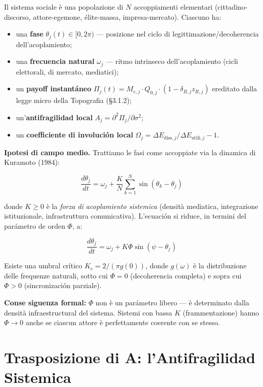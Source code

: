 Il sistema sociale è una popolazione di \(N\) accoppiamenti elementari
(cittadino-discorso, attore-egemone, élite-massa, impresa-mercato).
Ciascuno ha:

\begin{itemize}
\tightlist
\item
  una \textbf{fase} \(\theta_j(t) \in [0, 2\pi)\) --- posizione nel
  ciclo di legittimazione/decoherencia dell'acoplamiento;
\item
  una \textbf{frecuencia natural} \(\omega_j\) --- ritmo intrinseco
  dell'acoplamiento (cicli elettorali, di mercato, mediatici);
\item
  un \textbf{payoff instantáneo}
  \(\Pi_j(t) = M_{e,j} \cdot Q_{0,j} \cdot (1 - \delta_{R,j} z_{R,j})\)
  ereditato dalla legge micro della Topografia (\S{}3.1.2);
\item
  un'\textbf{antifragilidad local}
  \(A_j = \partial^2 \Pi_j / \partial \sigma^2\);
\item
  un \textbf{coefficiente di involución local}
  \(\Omega_j = \Delta E_{\text{diss},j}/\Delta E_{\text{utili},j} - 1\).
\end{itemize}

\Hypoth{} \textbf{Ipotesi di campo medio.} Trattiamo le fasi come
accoppiate via la dinamica di Kuramoto (1984):

\[
\frac{d\theta_j}{dt} = \omega_j + \frac{K}{N}\sum_{k=1}^{N} \sin(\theta_k - \theta_j)
\]

donde \(K \geq 0\) è la \emph{forza di acoplamiento sistemica} (densità
mediatica, integrazione istituzionale, infrastruttura comunicativa).
L'ecuación si riduce, in termini del parámetro de orden \(\Phi\), a:

\[
\frac{d\theta_j}{dt} = \omega_j + K\Phi \sin(\psi - \theta_j)
\]

Esiste una umbral crítico \(K_c = 2/(\pi g(0))\), donde \(g(\omega)\) è
la distribuzione delle frequenze naturali, sotto cui \(\Phi = 0\)
(decoherencia completa) e sopra cui \(\Phi > 0\) (sincronización
parziale).

\Proved{} \textbf{Conse siguenza formal:} \(\Phi\) non è un parámetro
libero --- è determinato dalla densità infraestructural del sistema.
Sistemi con bassa \(K\) (frammentazione) hanno \(\Phi \to 0\) anche se
ciascun attore è perfettamente coerente con se stesso.



\section{Trasposizione di A: l'Antifragilidad
Sistemica}\label{trasposizione-di-a-lantifragilituxe0-sistemica}

